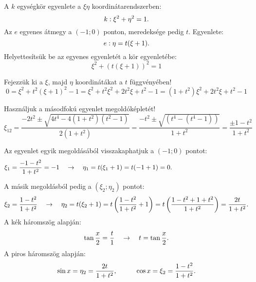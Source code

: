 \documentclass[a4paper, 12pt]{scrartcl}
\begin{document}
\begin{learnMore}
\begin{minipage}{.5\textwidth}
  \end{minipage}\hfill\begin{minipage}{.475\textwidth}
    A $k$ egységkör egyenlete a $\xi\eta$ koordinátarendszerben:
    \[
      k: \xi^2 + \eta^2 = 1
      \text.
    \]
    Az $e$ egyenes átmegy a $(-1;0)$ ponton, meredeksége pedig $t$.
    Egyenlete:
    \[
      e: \eta = t(\xi + 1)
      \text.
    \]
    Helyettesítsük be az egyenes egyenletét a kör egyenletébe:
    \[
      \xi^2 + (t(\xi + 1))^2 = 1
    \]
  \end{minipage}

  Fejezzük ki a $\xi$, majd $\eta$ koordinátákat a $t$ függvényében!
  \[
    0
    = \xi^2 + t^2(\xi + 1)^2 - 1
    = \xi^2 + t^2\xi^2 + 2t^2\xi + t^2 - 1
    = (1 + t^2)\xi^2 + 2t^2\xi + t^2 - 1
  \]

  Használjuk a másodfokú egyenlet megoldóképletét!
  \[
    \xi_{12} = \frac{
      - 2t^2 \pm \sqrt{4t^4 - 4(1 + t^2)(t^2 - 1)}
    }{
      2(1 + t^2)
    } = \frac{
      -t^2 \pm \sqrt{(t^4 - (t^4 - 1))}
    }{
      1 + t^2
    } = \frac{
      \pm 1 - t^2
    }{
      1 + t^2
    }
  \]

  Az egyenlet egyik megoldásából visszakaphatjuk a $(-1;0)$ pontot:
  \[
    \xi_1 = \frac{-1 - t^2}{1 + t^2} = -1
    \quad \rightarrow \quad
    \eta_1 = t(\xi_1 + 1) = t(-1 + 1) = 0
    \text.
    \hspace{41mm}
  \]

  A másik megoldásból pedig a $(\xi_2; \eta_2)$ pontot:
  \[
    \xi_2 = \frac{1 - t^2}{1 + t^2}
    \quad \rightarrow \quad
    \eta_2 = t(\xi_2 + 1) = t\left(
    \frac{1 - t^2}{1 + t^2} + 1
    \right) = t\left(
    \frac{1 - t^2 + 1 + t^2}{1 + t^2}
    \right) = \frac{2t}{1 + t^2}
    \text.
  \]
  A kék háromszög alapján:
  \[
    \tan \frac{x}{2} = \frac{t}{1}
    \quad \rightarrow \quad
    t = \tan \frac{x}{2}
    \text.
  \]
  A piros háromszög alapján:
  \[
    \sin x = \eta_2 = \frac{2t}{1 + t^2}
    \text,
    \hspace{1cm}
    \cos x = \xi_2 = \frac{1 - t^2}{1 + t^2}
    \text.
  \]
\end{learnMore}
\end{document}
